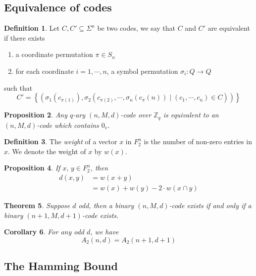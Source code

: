 \documentclass[11pt,a4paper]{article}
\theoremstyle{definition}
\newtheorem{definition}{Definition}[section]
\theoremstyle{plain}
\newtheorem{theorem}[definition]{Theorem}
\newtheorem{proposition}[definition]{Proposition}
\newtheorem{corollary}[definition]{Corollary}
\theoremstyle{remark}
\begin{document}
\subsection{Equivalence of codes} 

\begin{definition}
    Let $C, C' \subseteq \Sigma^n$ be two codes, we say that $C$ and $C'$ are equivalent if there exists
    \begin{enumerate}
        \item a coordinate permutation $\pi \in S_n$ 
        \item for each coordinate $i = 1, \cdots, n$, a symbol permutation $\sigma_i \colon Q \to Q$ 
    \end{enumerate}
    such that 
    $$C' = \left\{\left(\sigma_1(c_{\pi(1)}), \sigma_2(c_{\pi(2)}, \cdots, \sigma_n(c_\pi(n)) \mid (c_1, \cdots, c_n) \in C)\right)\right\}$$
\end{definition}

\begin{proposition}
    Any $q$-ary $(n, M, d)$-code over $\mathbb{Z}_q$ is equivalent to an $(n, M, d)$-code which contains $0_v$.  
\end{proposition}

\begin{definition}
    The \emph{weight} of a vector $x$ in $F_2^n$ is the number of non-zero entries in $x$. 
    We denote the weight of $x$ by $w(x)$. 
\end{definition}

\begin{proposition}
    If $x, \, y \in F_2^n$, then 
    \begin{align}
        d(x, y) &= w(x + y) \\
        &= w(x) + w(y) - 2 \cdot w(x \cap y)
    \end{align}
\end{proposition}

\begin{theorem}\label{thm:parity-check-codes}
    Suppose $d$ odd, then a binary $(n, M, d)$-code exists if and only if a binary $(n+1, M, d+1)$-code exists. 
\end{theorem}

\begin{corollary}
    For any odd $d$, we have 
    $$A_2(n, d) = A_2(n+1, d+1)$$
\end{corollary}

\subsection{The Hamming Bound} 
\end{document}
